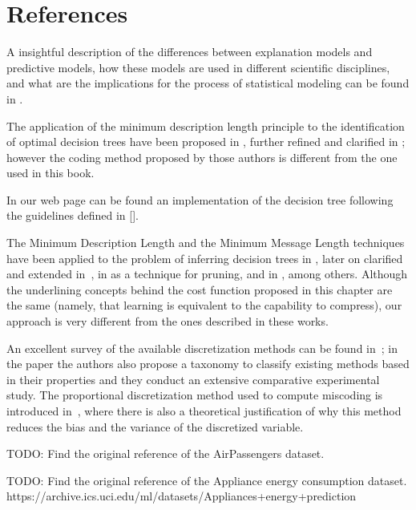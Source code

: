 %
%

\section*{References}
\label{sec:ML_references}

A insightful description of the differences between explanation models and predictive models, how these models are used in different scientific disciplines, and what are the implications for the process of statistical modeling can be found in \cite{shmueli2010explain}.

The application of the minimum description length principle to the identification of optimal decision trees have been proposed in \cite{quinlan1989inferring}, further refined and clarified in \cite{wallace1993coding}; however the coding method proposed by those authors is different from the one used in this book.

In our web page can be found an implementation of the decision tree following the guidelines defined in []. 


The Minimum Description Length \cite{grunwald2007minimum} and the Minimum Message Length \cite{wallace2005statistical} techniques have been applied to the problem of inferring decision trees in \cite{quinlan1989inferring}, later on clarified and extended in~\cite{wallace1993coding}, in \cite{mehta1995mdl} as a technique for pruning, and in \cite{rastogi1998public}, among others. Although the underlining concepts behind the cost function proposed in this chapter are the same (namely, that learning is equivalent to the capability to compress), our approach is very different from the ones described in these works.

An excellent survey of the available discretization methods can be found in~\cite{garcia2013survey}; in the paper the authors also propose a taxonomy to classify existing methods based in their properties and they conduct an extensive comparative experimental study. The proportional discretization method used to compute miscoding is introduced in~\cite{yang2009discretization}, where there is also a theoretical justification of why this method reduces the bias and the variance of the discretized variable.

{\color{red} TODO: Find the original reference of the AirPassengers dataset.}

{\color{red} TODO: Find the original reference of the Appliance energy consumption dataset. https://archive.ics.uci.edu/ml/datasets/Appliances+energy+prediction}



